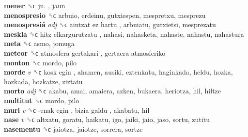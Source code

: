 \textbf{mener} ␝ϲ   jn. , jaun  \\
\textbf{menospresio} ␝ϲ  arbuio, erdeinu, gutxiespen, mespretxu, mesprezu  \\
\textbf{menospresiá} \emph{adj}  ␝ϲ   aintzat ez hartu , arbuiatu, gutxietsi, mesprezatu  \\
\textbf{meskla} ␝ϲ   hitz elkargurutzatu , nahasi, nahasketa, nahaste, nahastu, nahastura  \\
\textbf{meta} ␝ϲ  asmo, jomuga  \\
\textbf{meteor} ␝ϲ   atmosfera-gertakari ,  gertaera atmosferiko   \\
\textbf{monton} ␝ϲ  mordo, pilo  \\
\textbf{morde} \emph{v}  ␝ϲ   kosk egin , ahamen, ausiki, eztenkatu, haginkada, heldu, hozka, hozkada, hozkatze, ziztatu  \\
\textbf{morto} \emph{adj}  ␝ϲ  akabu, amai, amaiera, azken, bukaera, heriotza, hil, hiltze  \\
\textbf{multitut} ␝ϲ  mordo, pilo  \\
\textbf{muri} \emph{v}  ␝ϲ   -enak egin ,  bizia galdu , akabatu, hil  \\
\textbf{nase} \emph{v}  ␝ϲ  altxatu, goratu, haikatu, igo, jaiki, jaio, jaso, sortu, zutitu  \\
\textbf{nasementu} ␝ϲ  jaiotza, jaiotze, sorrera, sortze  \\
